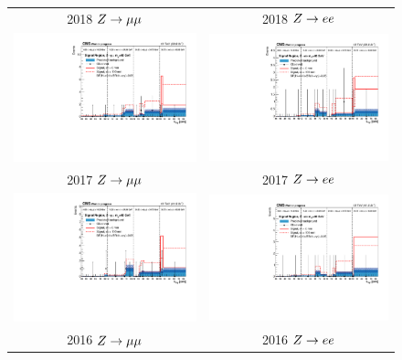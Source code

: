 \begin{figure}[htb!]
	\centering
	\begin{tabular}{c c}
		2018 $Z\to\mu\mu$ & 2018 $Z\to ee$\\
		\includegraphics[width=0.45\linewidth]{figs/05_analysis/closure_ZH_MU_m40_data_2018.pdf} &
		\includegraphics[width=0.45\linewidth]{figs/05_analysis/closure_ZH_ELE_m40_data_2018.pdf} \\
		2017 $Z\to\mu\mu$ & 2017 $Z\to ee$\\
		\includegraphics[width=0.45\linewidth]{figs/05_analysis/closure_ZH_MU_m40_data_2017.pdf} &
		\includegraphics[width=0.45\linewidth]{figs/05_analysis/closure_ZH_ELE_m40_data_2017.pdf} \\
		2016 $Z\to\mu\mu$ & 2016 $Z\to ee$\\

\end{tabular}
\end{figure}
